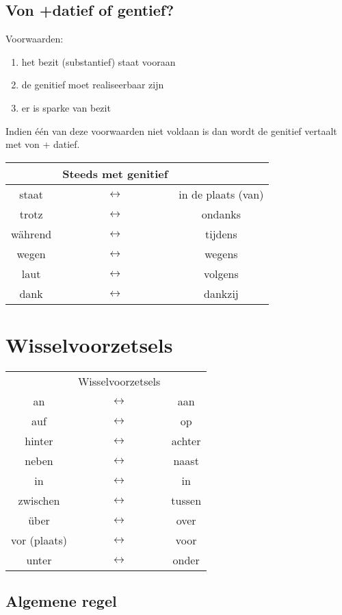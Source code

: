 \documentclass[main.tex]{subfiles}
\begin{document}
\subsection{Von +datief of gentief?}
Voorwaarden:
\begin{enumerate}
\item het bezit (substantief) staat vooraan
\item de genitief moet realiseerbaar zijn
\item er is sparke van bezit
\end{enumerate}
Indien één van deze voorwaarden niet voldaan is dan wordt de genitief vertaalt met von + datief.
\begin{tabular}{ccc}
 & Steeds met genitief &  \\ 
 \hline
staat & $\leftrightarrow$ & in de plaats (van) \\ 
trotz & $\leftrightarrow$ & ondanks \\ 
während & $\leftrightarrow$ & tijdens \\ 
wegen & $\leftrightarrow$ & wegens \\ 
laut & $\leftrightarrow$ & volgens \\ 
dank & $\leftrightarrow$ & dankzij \\ 
\end{tabular} 

\section{Wisselvoorzetsels}

\begin{tabular}{ccc}
 & Wisselvoorzetsels &  \\ 
an & $\leftrightarrow$ & aan \\ 
auf & $\leftrightarrow$ & op \\ 
hinter & $\leftrightarrow$ & achter \\ 
neben & $\leftrightarrow$ & naast \\ 
in & $\leftrightarrow$ & in \\ 
zwischen & $\leftrightarrow$ & tussen \\ 
über & $\leftrightarrow$ & over \\ 
vor (plaats) & $\leftrightarrow$ & voor \\ 
unter & $\leftrightarrow$ & onder \\ 
\end{tabular} 

\subsection{Algemene regel}
\end{document}
